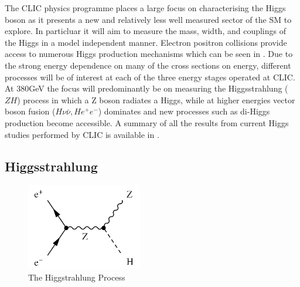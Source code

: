 The CLIC physics programme places a large focus on characterising the Higgs boson as it presents a new and relatively less well measured sector of the \ac{SM} to explore. In particluar it will aim to measure the mass, width, and couplings of the Higgs in a model independent manner. Electron positron collisions provide access to numerous Higgs production mechanisms which can be seen in . Due to the strong energy dependence on many of the cross sections on energy, different processes will be of interest at each of the three energy stages operated at CLIC. At 380GeV the focus will predominantly be on measuring the Higgsstrahlung ($ZH$) process in which a Z boson radiates a Higgs, while at higher energies vector boson fusion ($H\nu\bar{\nu},He^{+}e^{-}$) dominates and new processes such as di-Higgs production become accessible. A summary of all the results from current Higgs studies performed by CLIC is available in \cite{Abramowicz:2016zbo}.

\subsection{Higgsstrahlung}

\begin{figure}
  \centering
  \includegraphics[width=0.45\textwidth,keepaspectratio]{Theory/fig/HiggsStrahlung.png}
  \caption[The Higgstrahlung Process]{The Higgstrahlung Process}
  \label{fig:higgsstrahlung}
\end{figure}


